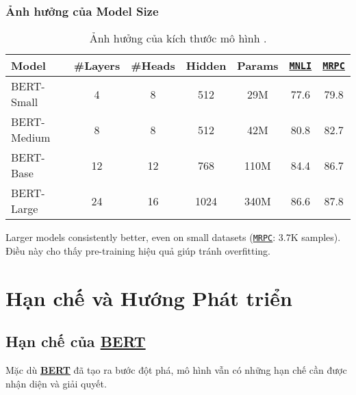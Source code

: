 \subsubsection{Ảnh hưởng của Model Size}
\begin{table}[H]
    \centering
    \caption{Ảnh hưởng của kích thước mô hình \cite{devlin2018bert}.}
    \label{tab:model_size_effect}
    \begin{tabular}{lcccccc}
        \toprule
        \textbf{Model} & \textbf{\#Layers} & \textbf{\#Heads} & \textbf{Hidden} & \textbf{Params} & \textbf{\hyperref[acro:mnli]{\texttt{MNLI}}} & \textbf{\hyperref[acro:mrpc]{\texttt{MRPC}}} \\
        \midrule
        BERT-Small & 4 & 8 & 512 & 29M & 77.6 & 79.8 \\
        BERT-Medium & 8 & 8 & 512 & 42M & 80.8 & 82.7 \\
        BERT-Base & 12 & 12 & 768 & 110M & 84.4 & 86.7 \\
        BERT-Large & 24 & 16 & 1024 & 340M & 86.6 & 87.8 \\
        \bottomrule
    \end{tabular}
\end{table}

Larger models consistently better, even on small datasets (\hyperref[acro:mrpc]{\texttt{MRPC}}: 3.7K samples). Điều này cho thấy pre-training hiệu quả giúp tránh overfitting.

\section{Hạn chế và Hướng Phát triển}
\label{sec:han_che_huong_phat_trien}

\subsection{Hạn chế của \hyperref[acro:bert]{\textbf{BERT}}}
\label{ssec:han_che_bert}

Mặc dù \hyperref[acro:bert]{\textbf{BERT}} đã tạo ra bước đột phá, mô hình vẫn có những hạn chế cần được nhận diện và giải quyết.

